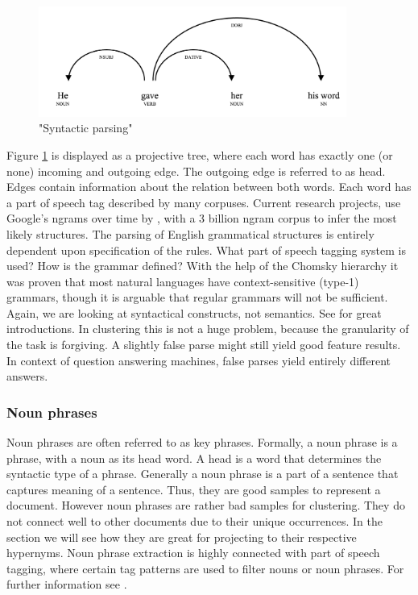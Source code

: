     \begin{figure}[h!]
      \centering
        \includegraphics[width=0.9\textwidth]{sentence_structure.png}
        \caption{"Syntactic parsing"}
        \label{syntactic_parsing}
    \end{figure} 

  Figure \ref{syntactic_parsing} is displayed as a projective tree, where each word has exactly one (or none) incoming and outgoing edge. The outgoing edge is referred to as head. Edges contain information about the relation between both words. Each word has a part of speech tag described by many corpuses. Current research projects, use Google's ngrams over time by \cite{SyntacticNgramsOverTime2013}, with a 3 billion ngram corpus to infer the most likely structures.
  The parsing of English grammatical structures is entirely dependent upon specification of the rules. What part of speech tagging system is used? How is the grammar defined? With the help of the Chomsky hierarchy it was proven that most natural languages have context-sensitive (type-1) grammars, though it is arguable that regular grammars will not be sufficient. Again, we are looking at syntactical constructs, not semantics. See \cite[chp. 16]{NLPBookJurafsky2000, FormalLanguageTheory2012} for great introductions.
  In clustering this is not a huge problem, because the granularity of the task is forgiving. A slightly false parse might still yield good feature results. In context of question answering machines, false parses yield entirely different answers.

  \subsubsection*{Noun phrases}
  Noun phrases are often referred to as key phrases. Formally, a noun phrase is a phrase, with a noun as its head word. A head is a word that determines the syntactic type of a phrase. Generally a noun phrase is a part of a sentence that captures meaning of a sentence. Thus, they are good samples to represent a document. However noun phrases are rather bad samples for clustering. They do not connect well to other documents due to their unique occurrences. In the \wordnet{} section we will see how they are great for projecting to their respective hypernyms. Noun phrase extraction is highly connected with part of speech tagging, where certain tag patterns are used to filter nouns or noun phrases. For further information see \cite[chp. 5, 12]{NLPBookJurafsky2000}.

